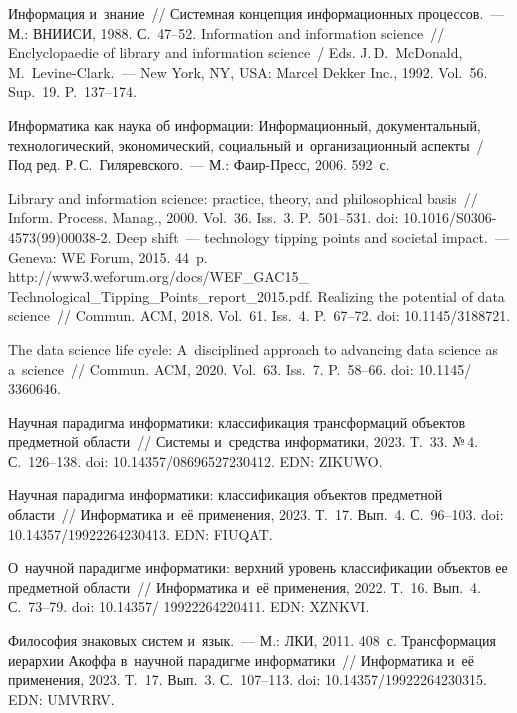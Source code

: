\begin{multicols}{2}
{{\begin{thebibliography}{99}
 Информация и~знание~// Сис\-тем\-ная концепция информационных 
процессов.~--- М.: ВНИИСИ, 1988. С.~47--52.
 Information and information science~// Enclyclopaedie of library and 
information science~/ Eds. J.\,D.~McDonald, 
M.~Levine-Clark.~--- New York, NY, USA: Marcel Dekker Inc., 1992. Vol.~56. Sup.~19. 
P.~137--174.

Информатика как наука об информации: Информационный, документальный, 
технологический, экономический, социальный и~организационный аспекты~/ Под ред. 
Р.\,С.~Гиляревского.~--- М.: Фаир-Пресс, 2006. 592~с.

 Library and information science: practice, theory, and philosophical basis~// 
Inform. Process. Manag., 2000. Vol.~36. Iss.~3. P.~501--531. doi:  
10.1016/S0306-\mbox{4573(99)00038-2}.
Deep shift~--- technology tipping points and societal impact.~--- Geneva: WE Forum, 2015. 44~p. 
{\sf http://www3.weforum.org/docs/WEF\_GAC15\_ Technological\_Tipping\_Points\_report\_2015.pdf}.
 Realizing the potential of 
data science~// Commun.  ACM, 2018. Vol.~61. Iss.~4. P.~67--72. doi: 10.1145/3188721.

 The data science life cycle: A~disciplined approach to advancing data science as 
a~science~// Commun.  ACM, 2020. Vol.~63. Iss.~7. P.~58--66. doi: 10.1145/ 3360646.


 Научная парадигма информатики: классификация трансформаций 
объектов предметной об\-ласти~// Системы и~средства информатики, 2023. Т.~33. №\,4. 
С.~126--138. doi: 10.14357/08696527230412. EDN: ZIKUWO.

 Научная парадигма информатики: классификация объектов предметной  
об\-ласти~// Информатика и~её применения, 2023. Т.~17. Вып.~4. С.~96--103. doi: 
10.14357/19922264230413. EDN: FIUQAT.

 О~научной парадигме информатики: верхний уровень классификации 
объектов ее предметной об\-ласти~// Информатика и~её применения, 2022. Т.~16. Вып.~4. 
С.~73--79. doi: 10.14357/ 19922264220411. EDN: XZNKVI.

 Философия знаковых систем и~язык.~--- М.: ЛКИ, 2011. 408~с.
 Трансформация иерархии Акоффа в~научной парадигме информатики~// 
Информатика и~её применения, 2023. Т.~17. Вып.~3. С.~107--113. doi: 
10.14357/19922264230315. EDN: UMVRRV.


\end{thebibliography}}}
\end{multicols}
